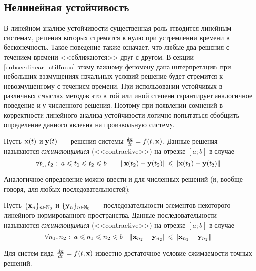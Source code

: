 \subsection{Нелинейная устойчивость}
\label{subsec:nonlinear_stability}

В линейном анализе устойчивости существенная роль отводится линейным системам,
решения которых стремятся к нулю при устремлении времени в бесконечность.
Такое поведение также означает, что любые два решения с течением времени <<сближаются>> друг с другом.
В секции \ref{subsec:linear_stiffness} этому важному феномену дана интерпретация:
при небольших возмущениях начальных условий решение будет стремится к невозмущенному с течением времени.
При использовании устойчивых в различных смыслах методов это в той или иной степени гарантирует аналогичное поведение и у численного решения.
Поэтому при появлении сомнений в корректности линейного анализа устойчивости логично попытаться обобщить определение данного явления на произвольную систему.

\begin{definition}
    \label{def:contractivity}
    Пусть $ \mathbf{x}(t) $ и $ \mathbf{y}(t) $~--- решения системы $ \frac{d \mathbf{x}}{d t} = f(t, \mathbf{x}) $.
    Данные решения называются \emph{сжимающимися} (<<contractive>>) на отрезке $ [a; b] $ в случае
    \[
        \forall t_1, t_2: \; a \leqslant t_1 \leqslant t_2 \leqslant b \qquad \| \mathbf{x}(t_2) - \mathbf{y}(t_2) \| \leqslant \| \mathbf{x}(t_1) - \mathbf{y}(t_2) \|
    \]
\end{definition}

Аналогичное определение можно ввести и для численных решений (и, вообще говоря, для любых последовательностей):

\begin{definition}
    \label{def:contractivity_sequence}
    Пусть $ \{\mathbf{x}_n\}_{n \in \mathbb{N}_0} $ и $ \{\mathbf{y}_n\}_{n \in \mathbb{N}_0} $~--- последовательности элементов некоторого линейного нормированного пространства.
    Данные последовательности называются \emph{сжимающимися} (<<contractive>>) на отрезке $ [a; b] $ в случае
    \[
        \forall n_1, n_2: \; a \leqslant n_1 \leqslant n_2 \leqslant b \quad \| \mathbf{x}_{n_2} - \mathbf{y}_{n_2} \| \leqslant \| \mathbf{x}_{n_1} - \mathbf{y}_{n_2} \|
    \]
\end{definition}

Для систем вида $ \frac{d \mathbf{x}}{d t} = f(t, \mathbf{x}) $ известно \cite{auzinger1990note, auzinger1993modern} достаточное условие
сжимаемости точных решений.

